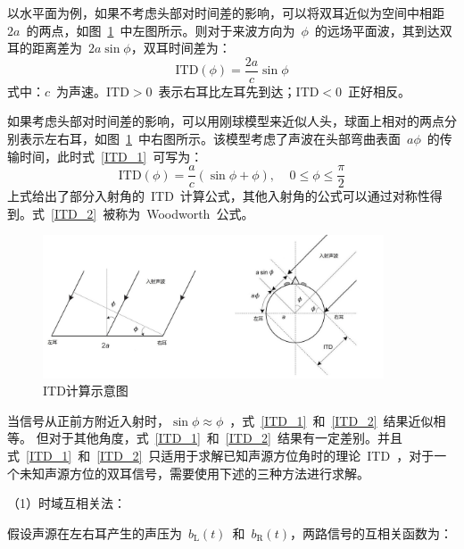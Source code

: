 以水平面为例，如果不考虑头部对时间差的影响，可以将双耳近似为空间中相距~$2a$~的两点，如图~\ref{fig:ITD_compute}~中左图所示。则对于来波方向为~$\phi$~的远场平面波，其到达双耳的距离差为~$2a\sin\phi$，双耳时间差为：
\begin{equation}\label{ITD_1}
\text{ITD}(\phi)=\frac{2a}{c}\sin\phi
\end{equation}
式中：$c$~为声速。$\text{ITD}>0$~表示右耳比左耳先到达；$\text{ITD}<0$~正好相反。

如果考虑头部对时间差的影响，可以用刚球模型来近似人头，球面上相对的两点分别表示左右耳，如图~\ref{fig:ITD_compute}~中右图所示。该模型考虑了声波在头部弯曲表面~$a\phi$~的传输时间，此时式~\eqref{ITD_1}~可写为：
\begin{equation}\label{ITD_2}
\text{ITD}(\phi)=\frac{a}{c}(\sin\phi+\phi),~~~~~ 0\leq \phi \leq \frac{\pi}{2}
\end{equation}
上式给出了部分入射角的~ITD~计算公式，其他入射角的公式可以通过对称性得到。式~\eqref{ITD_2}~被称为~Woodworth~公式。

\begin{figure}[H]
\centering
\includegraphics[width=0.9\textwidth]{figure/chapter5/ITD_compute_theory}
\caption{ITD计算示意图}
\label{fig:ITD_compute}
\end{figure}

当信号从正前方附近入射时，$\sin\phi\approx\phi$~，式~\eqref{ITD_1}~和~\eqref{ITD_2}~结果近似相等。
但对于其他角度，式~\eqref{ITD_1}~和~\eqref{ITD_2}~结果有一定差别。并且式~\eqref{ITD_1}~和~\eqref{ITD_2}~只适用于求解已知声源方位角时的理论~ITD~，对于一个未知声源方位的双耳信号，需要使用下述的三种方法进行求解。

（1）时域互相关法：

假设声源在左右耳产生的声压为~$b_{\text{L}}(t)$~和~$b_{\text{R}}(t)$，两路信号的互相关函数为：

